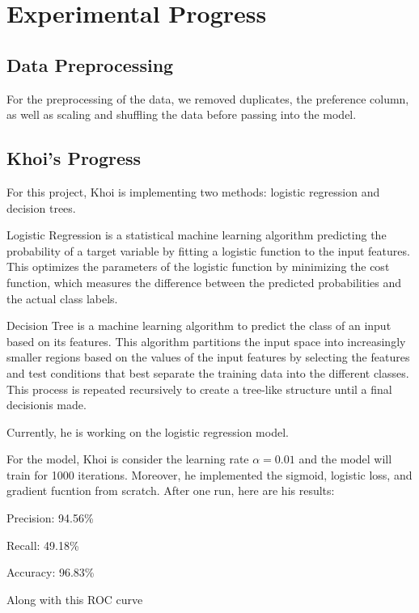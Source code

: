 \section{Experimental Progress}

\subsection{Data Preprocessing}

For the preprocessing of the data, we removed duplicates, the preference column, as well as scaling and shuffling the data before passing into the model.

\subsection{Khoi's Progress}

For this project, Khoi is implementing two methods: logistic regression and decision trees.

Logistic Regression is a statistical machine learning algorithm predicting the probability of a target variable by fitting a logistic function to the input features. This optimizes the parameters of the logistic function by minimizing the cost function, which measures the difference between the predicted probabilities and the actual class labels.

Decision Tree is a machine learning algorithm to predict the class of an input based on its features. This algorithm partitions the input space into increasingly smaller regions based on the values of the input features by selecting the features and test conditions that best separate the training data into the different classes. This process is repeated recursively to create a tree-like structure until a final decisionis made.

Currently, he is working on the logistic regression model.

For the model, Khoi is consider the learning rate $\alpha = 0.01$ and the model will train for 1000 iterations. Moreover, he implemented the sigmoid, logistic loss, and gradient fucntion from scratch. After one run, here are his results:

Precision: 94.56\%

Recall: 49.18\%

Accuracy: 96.83\%

Along with this ROC curve

